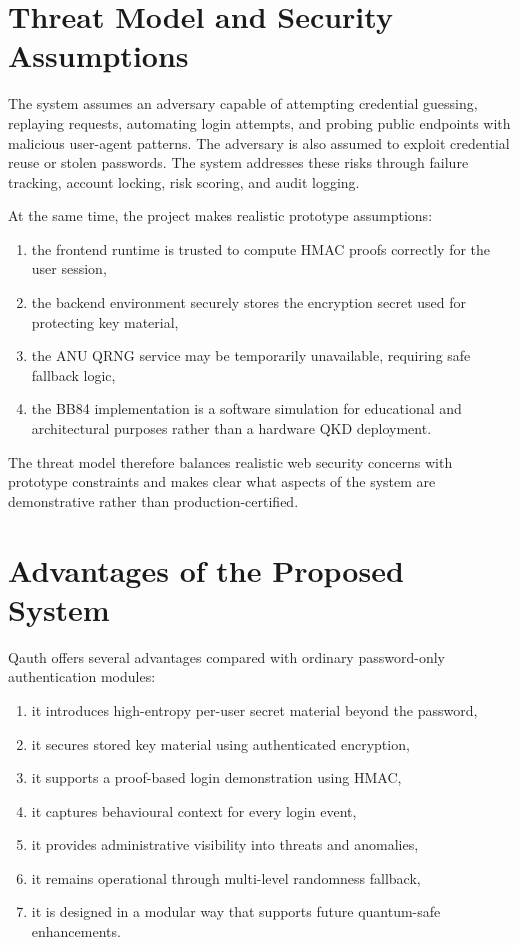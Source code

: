 \documentclass[12pt,a4paper]{report}
\begin{document}
\section{Threat Model and Security Assumptions}
The system assumes an adversary capable of attempting credential guessing, replaying requests, automating login attempts, and probing public endpoints with malicious user-agent patterns. The adversary is also assumed to exploit credential reuse or stolen passwords. The system addresses these risks through failure tracking, account locking, risk scoring, and audit logging.

At the same time, the project makes realistic prototype assumptions:

\begin{enumerate}
    \item the frontend runtime is trusted to compute HMAC proofs correctly for the user session,
    \item the backend environment securely stores the encryption secret used for protecting key material,
    \item the ANU QRNG service may be temporarily unavailable, requiring safe fallback logic,
    \item the BB84 implementation is a software simulation for educational and architectural purposes rather than a hardware QKD deployment.
\end{enumerate}

The threat model therefore balances realistic web security concerns with prototype constraints and makes clear what aspects of the system are demonstrative rather than production-certified.

\section{Advantages of the Proposed System}
Qauth offers several advantages compared with ordinary password-only authentication modules:

\begin{enumerate}
    \item it introduces high-entropy per-user secret material beyond the password,
    \item it secures stored key material using authenticated encryption,
    \item it supports a proof-based login demonstration using HMAC,
    \item it captures behavioural context for every login event,
    \item it provides administrative visibility into threats and anomalies,
    \item it remains operational through multi-level randomness fallback,
    \item it is designed in a modular way that supports future quantum-safe enhancements.
\end{enumerate}
\end{document}
